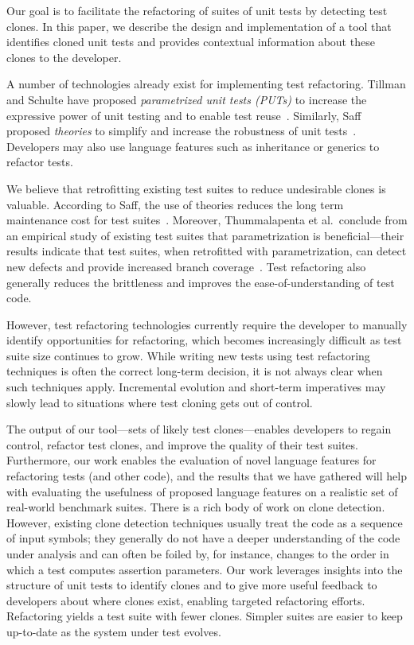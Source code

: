 \documentclass[10pt]{article}
\begin{document}
Our goal is to facilitate the refactoring of suites of unit tests by
detecting test clones.  In this paper, we describe the design and
implementation of a tool that identifies cloned unit tests and
provides contextual information about these clones to the developer.

A number of technologies already exist for implementing test
refactoring. Tillman and Schulte have proposed \emph{parametrized unit
  tests (PUTs)} to increase the expressive power of unit testing and
to enable test
reuse~\cite{Tillmann:2005:PUT:1081706.1081749}. Similarly, Saff
proposed \emph{theories} to simplify and increase the robustness of
unit tests~\cite{doclonesmatter}. Developers may also use language
features such as inheritance or generics to refactor tests.

We believe that retrofitting existing test suites to reduce
undesirable clones is valuable.  According to Saff, the use of
theories reduces the long term maintenance cost for test
suites~\cite{Saff:2007:TIL:1297846.1297919}. Moreover, Thummalapenta
et al.\ conclude from an empirical study of existing test suites that
parametrization is beneficial---their results indicate that test suites,
when retrofitted with parametrization, can detect new defects and provide
increased branch coverage~\cite{thummalapenta11:retrofitting}. Test
refactoring also generally reduces the brittleness and improves the
ease-of-understanding of test code.

However, test refactoring technologies currently require the developer to
manually identify opportunities for refactoring, which becomes
increasingly difficult as test suite size continues to grow.  While
writing new tests using test refactoring techniques is often the
correct long-term decision, it is not always clear when such techniques apply.
Incremental evolution and short-term imperatives may slowly lead to
situations where test cloning gets out of control.  

The output of our tool---sets of likely test clones---enables
developers to regain control, refactor test clones, and improve the
quality of their test suites. Furthermore, our work enables the
evaluation of novel language features for refactoring tests (and
other code), and the results that we have gathered will help with
evaluating the usefulness of proposed language features on a realistic
set of real-world benchmark suites.
There is a rich body of work on clone detection. However, existing
clone detection techniques usually treat the code as a sequence of
input symbols; they generally do not have a deeper understanding of
the code under analysis and can often be foiled by, for instance,
changes to the order in which a test computes assertion
parameters. Our work leverages insights into the structure of unit
tests to identify clones and to give more useful feedback to
developers about where clones exist, enabling targeted refactoring
efforts. Refactoring yields a test suite with fewer clones. Simpler
suites are easier to keep up-to-date as the system under test evolves.
\end{document}
